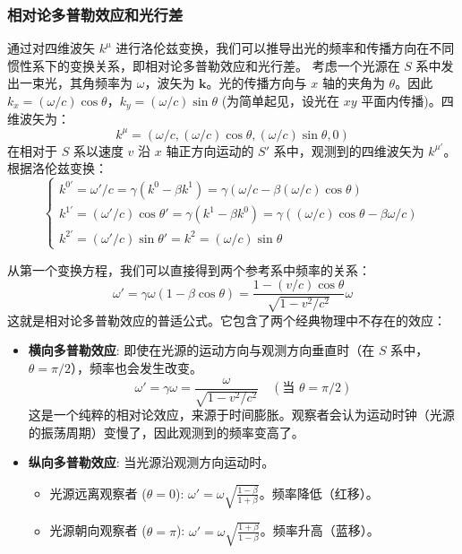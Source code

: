 \documentclass[fontset=none]{ctexart}
\begin{document}
\subsubsection{相对论多普勒效应和光行差}
通过对四维波矢 $k^{\mu}$ 进行洛伦兹变换，我们可以推导出光的频率和传播方向在不同惯性系下的变换关系，即相对论多普勒效应和光行差。
考虑一个光源在 $S$ 系中发出一束光，其角频率为 $\omega$，波矢为 $\bm{k}$。光的传播方向与 $x$ 轴的夹角为 $\theta$。因此 $k_x = (\omega/c)\cos\theta$，$k_y = (\omega/c)\sin\theta$ (为简单起见，设光在 $xy$ 平面内传播)。四维波矢为：
\begin{equation}
k^{\mu} = (\omega/c, (\omega/c)\cos\theta, (\omega/c)\sin\theta, 0)
\end{equation}
在相对于 $S$ 系以速度 $v$ 沿 $x$ 轴正方向运动的 $S'$ 系中，观测到的四维波矢为 $k^{\mu'}$。根据洛伦兹变换：
\begin{equation}
\begin{cases}
k^{0'} = \omega'/c = \gamma(k^0 - \beta k^1) = \gamma(\omega/c - \beta(\omega/c)\cos\theta) \\
k^{1'} = (\omega'/c)\cos\theta' = \gamma(k^1 - \beta k^0) = \gamma((\omega/c)\cos\theta - \beta\omega/c) \\
k^{2'} = (\omega'/c)\sin\theta' = k^2 = (\omega/c)\sin\theta
\end{cases}
\end{equation}

\begin{proposition}[相对论多普勒效应]
从第一个变换方程，我们可以直接得到两个参考系中频率的关系：
\begin{equation}
\omega' = \gamma\omega(1 - \beta\cos\theta) = \frac{1 - (v/c)\cos\theta}{\sqrt{1 - v^2/c^2}}\omega
\end{equation}
这就是相对论多普勒效应的普适公式。它包含了两个经典物理中不存在的效应：
\begin{itemize}
    \item \textbf{横向多普勒效应}: 即使在光源的运动方向与观测方向垂直时（在 $S$ 系中，$\theta=\pi/2$），频率也会发生改变。
    \begin{equation}
    \omega' = \gamma\omega = \frac{\omega}{\sqrt{1 - v^2/c^2}} \quad (\text{当 } \theta = \pi/2)
    \end{equation}
    这是一个纯粹的相对论效应，来源于时间膨胀。观察者会认为运动时钟（光源的振荡周期）变慢了，因此观测到的频率变高了。
    \item \textbf{纵向多普勒效应}: 当光源沿观测方向运动时。
    \begin{itemize}
        \item 光源远离观察者 ($\theta = 0$): $\omega' = \omega\sqrt{\frac{1-\beta}{1+\beta}}$。频率降低（红移）。
        \item 光源朝向观察者 ($\theta = \pi$): $\omega' = \omega\sqrt{\frac{1+\beta}{1-\beta}}$。频率升高（蓝移）。
    \end{itemize}
\end{itemize}
\end{proposition}
\end{document}
